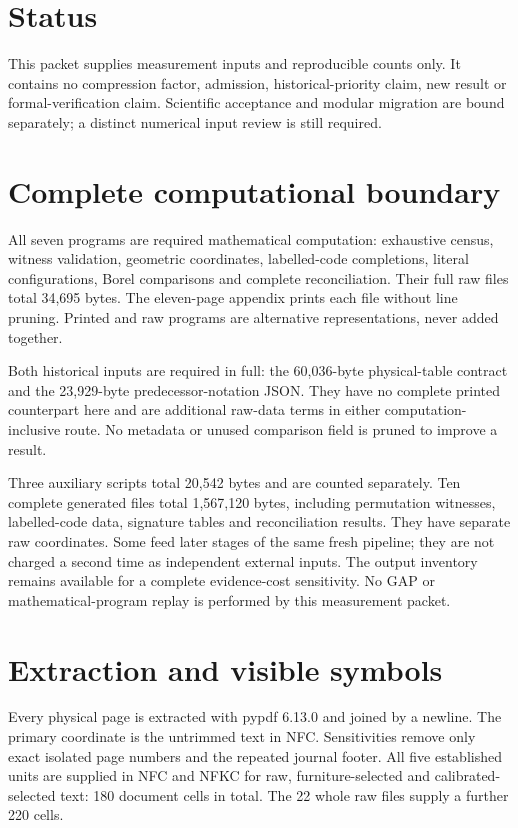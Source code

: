 \documentclass[11pt,a4paper]{article}
\begin{document}
\section*{Status}
This packet supplies measurement inputs and reproducible counts only. It contains no compression factor, admission, historical-priority claim, new result or formal-verification claim. Scientific acceptance and modular migration are bound separately; a distinct numerical input review is still required.
\newpage
\section*{Complete computational boundary}
All seven programs are required mathematical computation: exhaustive census, witness validation, geometric coordinates, labelled-code completions, literal configurations, Borel comparisons and complete reconciliation. Their full raw files total 34,695 bytes. The eleven-page appendix prints each file without line pruning. Printed and raw programs are alternative representations, never added together.

Both historical inputs are required in full: the 60,036-byte physical-table contract and the 23,929-byte predecessor-notation JSON. They have no complete printed counterpart here and are additional raw-data terms in either computation-inclusive route. No metadata or unused comparison field is pruned to improve a result.

Three auxiliary scripts total 20,542 bytes and are counted separately. Ten complete generated files total 1,567,120 bytes, including permutation witnesses, labelled-code data, signature tables and reconciliation results. They have separate raw coordinates. Some feed later stages of the same fresh pipeline; they are not charged a second time as independent external inputs. The output inventory remains available for a complete evidence-cost sensitivity. No GAP or mathematical-program replay is performed by this measurement packet.

\section*{Extraction and visible symbols}
Every physical page is extracted with pypdf 6.13.0 and joined by a newline. The primary coordinate is the untrimmed text in NFC. Sensitivities remove only exact isolated page numbers and the repeated journal footer. All five established units are supplied in NFC and NFKC for raw, furniture-selected and calibrated-selected text: 180 document cells in total. The 22 whole raw files supply a further 220 cells.
\end{document}
